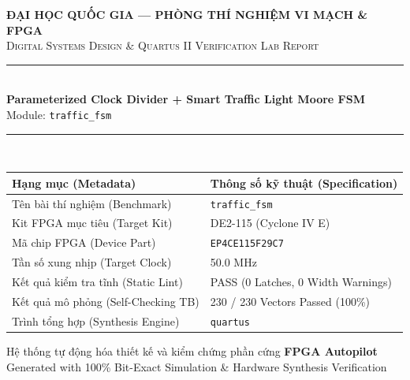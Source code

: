 \documentclass[11pt,a4paper]{article}
\begin{document}
\begin{titlepage}

    \centering
    \vspace*{1.6cm}
    {\Large\bfseries\textcolor{deepblue}{ĐẠI HỌC QUỐC GIA — PHÒNG THÍ NGHIỆM VI MẠCH \& FPGA}\\[0.3cm]}
    {\large\textsc{Digital Systems Design \& Quartus II Verification Lab Report}}\\[1.2cm]

    \rule{0.82\textwidth}{1.2pt}\\[0.5cm]
    {\huge\bfseries\textcolor{deepblue}{Parameterized Clock Divider + Smart Traffic Light Moore FSM}}\\[0.4cm]
    {\Large Module: \texttt{traffic\_fsm}}\\[0.4cm]
    \rule{0.82\textwidth}{1.2pt}\\[1.4cm]

    \begin{tabularx}{0.84\textwidth}{@{}lX@{}}
        \toprule
        \textbf{Hạng mục (Metadata)} & \textbf{Thông số kỹ thuật (Specification)} \\
        \midrule
        Tên bài thí nghiệm (Benchmark) & \texttt{traffic\_fsm} \\
        Kit FPGA mục tiêu (Target Kit) & DE2-115 (Cyclone IV E) \\
        Mã chip FPGA (Device Part) & \texttt{EP4CE115F29C7} \\
        Tần số xung nhịp (Target Clock) & 50.0 MHz \\
        Kết quả kiểm tra tĩnh (Static Lint) & PASS (0 Latches, 0 Width Warnings) \\
        Kết quả mô phỏng (Self-Checking TB) & 230 / 230 Vectors Passed (100\%) \\
        Trình tổng hợp (Synthesis Engine) & \texttt{quartus} \\
        \bottomrule
    \end{tabularx}

    \vfill
    {\normalsize Hệ thống tự động hóa thiết kế và kiểm chứng phần cứng \textbf{FPGA Autopilot}}\\[0.2cm]
    {\small Generated with 100\% Bit-Exact Simulation \& Hardware Synthesis Verification}
    \vspace*{1.2cm}
\end{titlepage}
\end{document}
